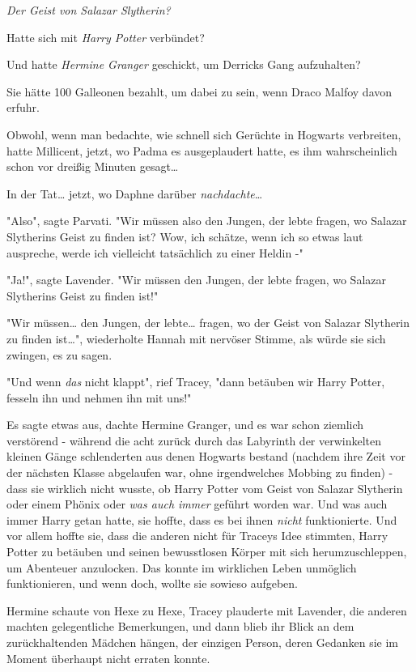 {\emph{Der Geist von Salazar Slytherin?}

Hatte sich mit \emph{Harry Potter} verbündet?

Und hatte \emph{Hermine Granger} geschickt, um Derricks Gang aufzuhalten?

Sie hätte 100 Galleonen bezahlt, um dabei zu sein, wenn Draco Malfoy davon erfuhr.

Obwohl, wenn man bedachte, wie schnell sich Gerüchte in Hogwarts verbreiten, hatte Millicent, jetzt, wo Padma es ausgeplaudert hatte, es ihm wahrscheinlich schon vor dreißig Minuten gesagt…

In der Tat… jetzt, wo Daphne darüber \emph{nachdachte}…

"Also", sagte Parvati. "Wir müssen also den Jungen, der lebte fragen, wo Salazar Slytherins Geist zu finden ist? Wow, ich schätze, wenn ich so etwas laut auspreche, werde ich vielleicht tatsächlich zu einer Heldin -"

"Ja!", sagte Lavender. "Wir müssen den Jungen, der lebte fragen, wo Salazar Slytherins Geist zu finden ist!"

"Wir müssen… den Jungen, der lebte… fragen, wo der Geist von Salazar Slytherin zu finden ist…", wiederholte Hannah mit nervöser Stimme, als würde sie sich zwingen, es zu sagen.

"Und wenn \emph{das} nicht klappt", rief Tracey, "dann betäuben wir Harry Potter, fesseln ihn und nehmen ihn mit uns!"

Es sagte etwas aus, dachte Hermine Granger, und es war schon ziemlich verstörend - während die acht zurück durch das Labyrinth der verwinkelten kleinen Gänge schlenderten aus denen Hogwarts bestand (nachdem ihre Zeit vor der nächsten Klasse abgelaufen war, ohne irgendwelches Mobbing zu finden) - dass sie wirklich nicht wusste, ob Harry Potter vom Geist von Salazar Slytherin oder einem Phönix oder \emph{was auch immer} geführt worden war. Und was auch immer Harry getan hatte, sie hoffte, dass es bei ihnen \emph{nicht} funktionierte. Und vor allem hoffte sie, dass die anderen nicht für Traceys Idee stimmten, Harry Potter zu betäuben und seinen bewusstlosen Körper mit sich herumzuschleppen, um Abenteuer anzulocken. Das konnte im wirklichen Leben unmöglich funktionieren, und wenn doch, wollte sie sowieso aufgeben.

Hermine schaute von Hexe zu Hexe, Tracey plauderte mit Lavender, die anderen machten gelegentliche Bemerkungen, und dann blieb ihr Blick an dem zurückhaltenden Mädchen hängen, der einzigen Person, deren Gedanken sie im Moment überhaupt nicht erraten konnte.

}
